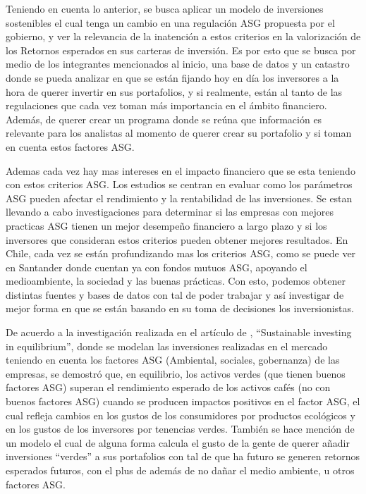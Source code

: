 Teniendo en cuenta lo anterior, se busca aplicar un modelo de inversiones sostenibles el cual tenga un cambio en una regulación ASG propuesta por el gobierno, y ver la relevancia de la inatención a estos criterios en la valorización de los Retornos esperados en sus carteras de inversión. Es por esto que se busca por medio de los integrantes mencionados al inicio, una base de datos y un catastro donde se pueda analizar en que se están fijando hoy en día los inversores a la hora de querer invertir en sus portafolios, y si realmente, están al tanto de las regulaciones que cada vez toman más importancia en el ámbito financiero. Además, de querer crear un programa donde se reúna que información es relevante para los analistas al momento de querer crear su portafolio y si toman en cuenta estos factores ASG.

\vspace{0.5cm}

Ademas cada vez hay mas intereses en el impacto financiero que se esta teniendo con estos criterios ASG. Los estudios se centran en evaluar como los parámetros ASG pueden afectar el rendimiento y la rentabilidad de las inversiones. Se estan llevando a cabo investigaciones para determinar si las empresas con mejores practicas ASG tienen un mejor desempeño financiero a largo plazo y si los inversores que consideran estos criterios pueden obtener mejores resultados. En Chile, cada vez se están profundizando mas los criterios ASG, como se puede ver en Santander donde cuentan ya con fondos mutuos ASG, apoyando el medioambiente, la sociedad y las buenas prácticas. Con esto, podemos obtener distintas fuentes y bases de datos con tal de poder trabajar y así investigar de mejor forma en que se están basando en su toma de decisiones los inversionistas.

\vspace{0.5cm}

De acuerdo a la investigación realizada en el artículo de , “Sustainable investing in equilibrium”, donde se modelan las inversiones realizadas en el mercado teniendo en cuenta los factores ASG (Ambiental, sociales, gobernanza) de las empresas, se demostró que, en equilibrio, los activos verdes (que tienen buenos factores ASG) superan el rendimiento esperado de los activos cafés (no con buenos factores ASG) cuando se producen impactos positivos en el factor ASG, el cual refleja cambios en los gustos de los consumidores por productos ecológicos y en los gustos de los inversores por tenencias verdes. También se hace mención de un modelo el cual de alguna forma calcula el gusto de la gente de querer añadir inversiones “verdes” a sus portafolios con tal de que ha futuro se generen retornos esperados futuros, con el plus de además de no dañar el medio ambiente, u otros factores ASG. 


